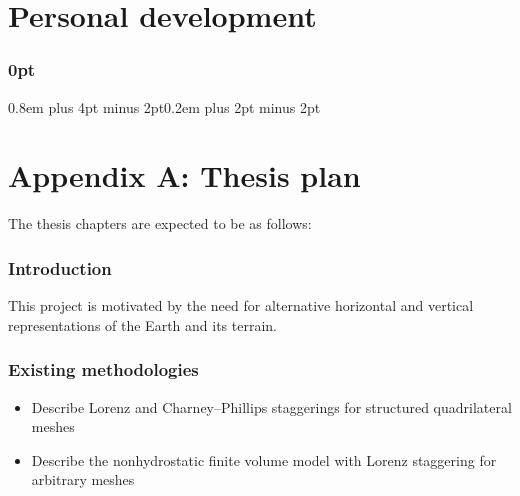 \documentclass[a4paper,11pt]{article}
\begin{document}



%
%



\section{Personal development}

% 

                                                 


\newpage

\titlespacing\subsubsection{0pt}{0.8em plus 4pt minus 2pt}{0.2em plus 2pt minus 2pt}

\section*{Appendix A: Thesis plan}
The thesis chapters are expected to be as follows:

\subsubsection*{Introduction}
\noindent This project is motivated by the need for alternative horizontal and vertical representations of the Earth and its terrain.

\subsubsection*{Existing methodologies}
\begin{itemize}[itemsep=0.1em]
	\item Describe Lorenz and Charney--Phillips staggerings for structured quadrilateral meshes
	\item Describe the nonhydrostatic finite volume model with Lorenz staggering for arbitrary meshes \citep{weller-shahrokhi2014}
\end{itemize}
\end{document}
